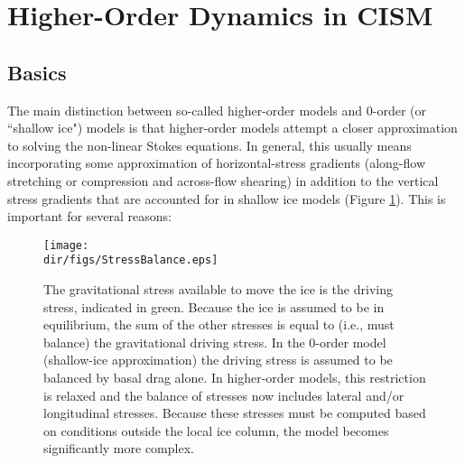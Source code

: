
\section{Higher-Order Dynamics in CISM}
\label{sc:higher-order-into}

\subsection{Basics}
The main distinction between so-called higher-order models and 0-order (or ``shallow ice") models is that higher-order models attempt a closer approximation to solving the non-linear Stokes equations. In general, this usually means incorporating some approximation of horizontal-stress gradients (along-flow stretching or compression and across-flow shearing) in addition to the vertical stress gradients that are accounted for in shallow ice models (Figure \ref{fig:stressbalance}). This is important for several reasons:

\begin{figure}
  \begin{center}
    \texttt{[image: \\dir/figs/StressBalance.eps]}
  \end{center}
  \caption{The gravitational stress available to move the ice is the driving stress, indicated in green. Because the ice is assumed to be in equilibrium, the sum of the other stresses is equal to (i.e., must balance) the gravitational driving stress. In the 0-order model (shallow-ice approximation) the driving stress is assumed to be balanced by basal drag alone. In higher-order models, this restriction is relaxed and the balance of stresses now includes lateral and/or longitudinal stresses. Because these stresses must be computed based on conditions outside the local ice column, the model becomes significantly more complex.}
  \label{fig:stressbalance}
\end{figure} 

